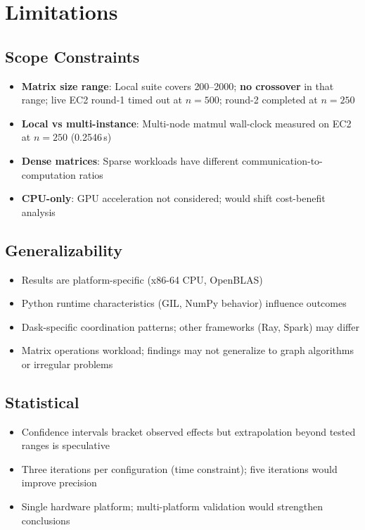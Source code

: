\section{Limitations}

\subsection{Scope Constraints}

\begin{itemize}
    \item \textbf{Matrix size range}: Local suite covers 200--2000; \textbf{no crossover} in that range; live EC2 round-1 timed out at $n{=}500$; round-2 completed at $n{=}250$
    \item \textbf{Local vs multi-instance}: Multi-node matmul wall-clock measured on EC2 at $n{=}250$ (0.2546\,s)
    \item \textbf{Dense matrices}: Sparse workloads have different communication-to-computation ratios
    \item \textbf{CPU-only}: GPU acceleration not considered; would shift cost-benefit analysis
\end{itemize}

\subsection{Generalizability}

\begin{itemize}
    \item Results are platform-specific (x86-64 CPU, OpenBLAS)
    \item Python runtime characteristics (GIL, NumPy behavior) influence outcomes
    \item Dask-specific coordination patterns; other frameworks (Ray, Spark) may differ
    \item Matrix operations workload; findings may not generalize to graph algorithms or irregular problems
\end{itemize}

\subsection{Statistical}

\begin{itemize}
    \item Confidence intervals bracket observed effects but extrapolation beyond tested ranges is speculative
    \item Three iterations per configuration (time constraint); five iterations would improve precision
    \item Single hardware platform; multi-platform validation would strengthen conclusions
\end{itemize}

